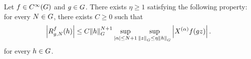 \begin{proposition}
\label{proposition:Taylor_theorem}
    Let $f \in \SmoothFunctions \Group$ and $g \in \Group$.
    There exists $\eta \geq 1$ satisfying the following property:
    for every $N \in \Group$,
    there exists $C \geq 0$ such that
    \begin{align*}
        \abs {\TaylorRemainder f g N (h)}
        \leq
        C \norm [\Group] h^{N + 1}
        \sup_{\abs \alpha \leq N + 1}
        \sup_{\norm [\Group] z \leq \eta \norm [\Group] h}
        \abs {\TaylorLeftDifferentialOperator \alpha f(g z)}.
    \end{align*}
    for every $h \in \Group$.
\end{proposition}
